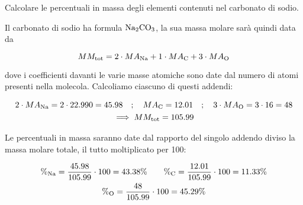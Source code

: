 \begin{esercizio}
    Calcolare le percentuali in massa degli elementi contenuti nel carbonato di sodio.
\end{esercizio}
\begin{soluzione}
    Il carbonato di sodio ha formula $\rm Na_2CO_3$, la sua massa molare sarà quindi data da

\begin{equation*}
    MM_{\rm tot}=2 \cdot MA_{\rm Na} + 1 \cdot MA_{\rm C} + 3 \cdot MA_{\rm O}
\end{equation*}

dove i coefficienti davanti le varie masse atomiche sono date dal numero di atomi presenti nella molecola. Calcoliamo ciascuno di questi addendi:

\begin{gather*}
    2 \cdot MA_{\rm Na}
    =2 \cdot 22.990
    =45.98
    \quad;\quad
    MA_{\rm C}
    =12.01
    \quad;\quad
    3 \cdot MA_{\rm O}
    =3 \cdot 16
    =48
    \\
    \implies
    MM_{\rm tot}=105.99
\end{gather*}

Le percentuali in massa saranno date dal rapporto del singolo addendo diviso la massa molare totale, il tutto moltiplicato per 100:

\begin{gather*}
    \%_{\rm Na}
    =\frac{45.98}{105.99} \cdot 100
    =43.38 \%
    \qquad
    \%_{\rm C}
    =\frac{12.01}{105.99} \cdot 100
    =11.33 \%
    \\
    \%_{\rm O}
    =\frac{48}{105.99} \cdot 100
    =45.29\%
\end{gather*}

\end{soluzione}